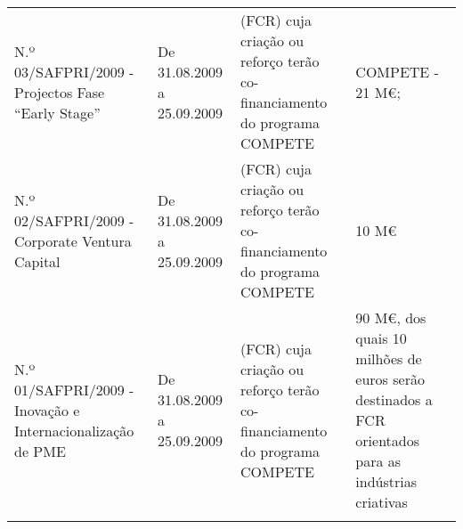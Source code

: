 \documentclass[]{book}
\newcommand{\euro}{€}
\theoremstyle{definition}
\theoremstyle{definition}
\theoremstyle{definition}
\theoremstyle{remark}
\begin{document}
\begin{longtable}[]{@{}llll@{}}
\begin{minipage}[t]{0.17\columnwidth}\raggedright\strut
N.º 03/SAFPRI/2009 - Projectos Fase ``Early Stage''\strut
\end{minipage} & \begin{minipage}[t]{0.17\columnwidth}\raggedright\strut
De 31.08.2009 a 25.09.2009\strut
\end{minipage} & \begin{minipage}[t]{0.17\columnwidth}\raggedright\strut
(FCR) cuja criação ou reforço terão co-financiamento do programa
COMPETE\strut
\end{minipage} & \begin{minipage}[t]{0.17\columnwidth}\raggedright\strut
COMPETE - 21 M\euro{};\strut
\end{minipage}\tabularnewline
\begin{minipage}[t]{0.17\columnwidth}\raggedright\strut
N.º 02/SAFPRI/2009 - Corporate Ventura Capital\strut
\end{minipage} & \begin{minipage}[t]{0.17\columnwidth}\raggedright\strut
De 31.08.2009 a 25.09.2009\strut
\end{minipage} & \begin{minipage}[t]{0.17\columnwidth}\raggedright\strut
(FCR) cuja criação ou reforço terão co-financiamento do programa
COMPETE\strut
\end{minipage} & \begin{minipage}[t]{0.17\columnwidth}\raggedright\strut
10 M\euro{}\strut
\end{minipage}\tabularnewline
\begin{minipage}[t]{0.17\columnwidth}\raggedright\strut
N.º 01/SAFPRI/2009 - Inovação e Internacionalização de PME\strut
\end{minipage} & \begin{minipage}[t]{0.17\columnwidth}\raggedright\strut
De 31.08.2009 a 25.09.2009\strut
\end{minipage} & \begin{minipage}[t]{0.17\columnwidth}\raggedright\strut
(FCR) cuja criação ou reforço terão co-financiamento do programa
COMPETE\strut
\end{minipage} & \begin{minipage}[t]{0.17\columnwidth}\raggedright\strut
90 M\euro{}, dos quais 10 milhões de euros serão destinados a FCR
orientados para as indústrias criativas\strut
\end{minipage}\tabularnewline
\begin{minipage}[t]{0.17\columnwidth}\raggedright\strut

\end{minipage}
\end{longtable}
\end{document}
